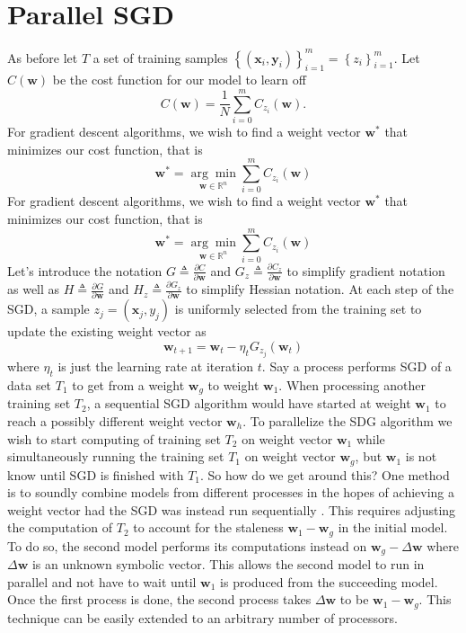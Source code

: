 \section{Parallel SGD}
As before let $T$ a set of training samples $\left\lbrace \left( \bm{x}_{i}, \bm{y}_i \right) \right\rbrace_{i=1}^{m} = \left\lbrace z_{i} \right\rbrace_{i=1}^{m}$. Let $C \left( \bm{w} \right)$ be the cost function for our model to learn off
\[
    C \left( \bm{w} \right) = \frac{1}{N} \sum_{i=0}^{m} C_{z_{i}}\left( \bm{w} \right).
\]
For gradient descent algorithms, we wish to find a weight vector $\bm{w}^{\ast}$ that minimizes our cost function, that is
\[
    \bm{w}^{\ast} = \underset{\bm{w} \in \mathbb{R}^{n}}{\arg \min } \sum_{i=0}^{m} C_{z_{i}}\left( \bm{w} \right)
\]
For gradient descent algorithms, we wish to find a weight vector $\bm{w}^{\ast}$ that minimizes our cost function, that is
\[
    \bm{w}^{\ast} = \underset{\bm{w} \in \mathbb{R}^{n}}{\arg \min } \sum_{i=0}^{m} C_{z_{i}}\left( \bm{w} \right)
\]
Let's introduce the notation $G \triangleq \frac{\partial C}{\partial \bm{w}}$ and $G_{z} \triangleq \frac{\partial C_{z}}{\partial \bm{w}}$ to simplify gradient notation as well as $H \triangleq \frac{\partial G}{\partial \bm{w}}$ and $H_{z} \triangleq \frac{\partial G_{z}}{\partial \bm{w}}$ to simplify Hessian notation. At each step of the SGD, a sample $z_{j} = \left( \bm{x}_j , y_{j} \right)$ is uniformly selected from the training set to update the existing weight vector as
\[
    \bm{w}_{t+1} = \bm{w}_{t} - \eta_{t} G_{z_{j}} \left( \bm{w}_{t} \right)
\]
where $\eta_{t}$ is just the learning rate at iteration $t$. Say a process performs SGD of a data set $T_{1}$ to get from a weight $\bm{w}_{g}$ to weight $\bm{w}_{1}$. When processing another training set $T_{2}$, a sequential SGD algorithm would have started at weight $\bm{w}_{1}$ to reach a possibly different weight vector $\bm{w}_{h}$. To parallelize the SDG algorithm we wish to start computing of training set $T_2$ on weight vector $\bm{w}_{1}$ while simultaneously running the training set $T_1$ on weight vector $\bm{w}_{g}$, but $\bm{w}_{1}$ is not know until SGD is finished with $T_1$. So how do we get around this? One method is to soundly combine models from different processes in the hopes of achieving a weight vector had the SGD was instead run sequentially \cite{MalekiSaeed2017PSGD}. This requires adjusting the computation of $T_2$ to account for the staleness $\bm{w}_{1} - \bm{w}_{g}$ in the initial model. To do so, the second model performs its computations instead on $\bm{w}_{g} - \Delta \bm{w}$ where $\Delta \bm{w}$ is an unknown symbolic vector. This allows the second model to run in parallel and not have to wait until $\bm{w}_{1}$ is produced from the succeeding model. Once the first process is done, the second process takes $\Delta \bm{w}$ to be $\bm{w}_{1} - \bm{w}_{g}$. This technique can be easily extended to an arbitrary number of processors.\\[1\baselineskip]
